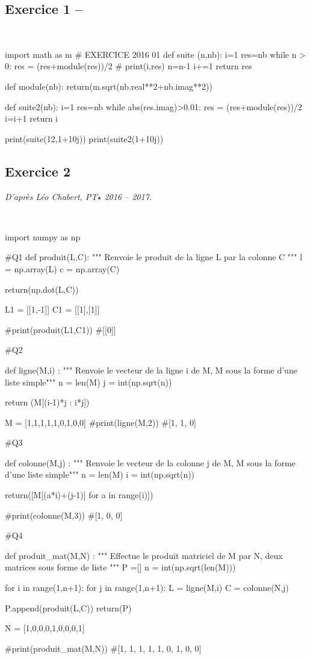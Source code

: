 \documentclass[10pt,fleqn]{article} %
\begin{document}
\subsection*{Exercice 1  -- }
\begin{corrige}
$\quad$
\begin{python}
import math as m
# EXERCICE 2016 01
def suite (n,nb):
    i=1
    res=nb
    while n > 0:
        res = (res+module(res))/2
       # print(i,res)
        n=n-1
        i+=1
    return res


def module(nb):
    return(m.sqrt(nb.real**2+nb.imag**2))

def suite2(nb):
    i=1
    res=nb
    while abs(res.imag)>0.01:
        res = (res+module(res))/2
        i=i+1
    return i

print(suite(12,1+10j))
print(suite2(1+10j))
\end{python}
\end{corrige}


\subsection*{Exercice 2}
\textit{D'après Léo Chabert, PT$\star$ 2016 -- 2017.}
\begin{corrige}
$\quad$
\begin{python}
import numpy as np

#Q1
def produit(L,C):
    """ Renvoie le produit de la ligne L par la colonne C """
    l = np.array(L)
    c = np.array(C)

    return(np.dot(L,C))
    
L1 = [[1,-1]]
C1 = [[1],[1]]

#print(produit(L1,C1))
#[[0]]

#Q2

def ligne(M,i) :
    """ Renvoie le vecteur de la ligne i de M,
    M sous la forme d'une liste simple"""
    n = len(M)
    j = int(np.sqrt(n))

    return (M[(i-1)*j : i*j])

M = [1,1,1,1,1,0,1,0,0]
#print(ligne(M,2))
#[1, 1, 0]

#Q3

def colonne(M,j) :
    """ Renvoie le vecteur de la colonne j de M,
    M sous la forme d'une liste simple"""
    n = len(M)
    i = int(np.sqrt(n))

    return([M[(a*i)+(j-1)] for a in range(i)])

#print(colonne(M,3))
#[1, 0, 0]

#Q4

def produit_mat(M,N) :
    """ Effectue le produit matriciel de M par N, deux matrices sous forme de liste """
    P =[]
    n = int(np.sqrt(len(M)))

    for i in range(1,n+1):
        for j in range(1,n+1):
            L = ligne(M,i)
            C = colonne(N,j)
            
            P.append(produit(L,C))
    return(P)

N = [1,0,0,0,1,0,0,0,1]

#print(produit_mat(M,N))
#[1, 1, 1, 1, 1, 0, 1, 0, 0]      
\end{python}
\end{corrige}
\end{document}
